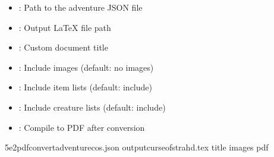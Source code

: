 \documentclass[letterpaper,10pt,english]{sphinxmanual}
\begin{document}
\sphinxAtStartPar
{}
\begin{itemize}
\item {} 
\sphinxAtStartPar
{}: Path to the adventure JSON file

\end{itemize}

\sphinxAtStartPar
{}
\begin{itemize}
\item {} 
\sphinxAtStartPar
{}: Output LaTeX file path

\item {} 
\sphinxAtStartPar
{}: Custom document title

\item {} 
\sphinxAtStartPar
{}: Include images (default: no images)

\item {} 
\sphinxAtStartPar
{}: Include item lists (default: include)

\item {} 
\sphinxAtStartPar
{}: Include creature lists (default: include)

\item {} 
\sphinxAtStartPar
{}: Compile to PDF after conversion

\end{itemize}

\sphinxAtStartPar
{}

\begin{sphinxVerbatim}[commandchars=\\\{\}]
5e2pdfconvertadventurecos.json
\PYGZhy{}\PYGZhy{}outputcurse\PYGZhy{}of\PYGZhy{}strahd.tex
\PYGZhy{}\PYGZhy{}title
\PYGZhy{}\PYGZhy{}images
\PYGZhy{}\PYGZhy{}pdf
\end{sphinxVerbatim}
\end{document}
